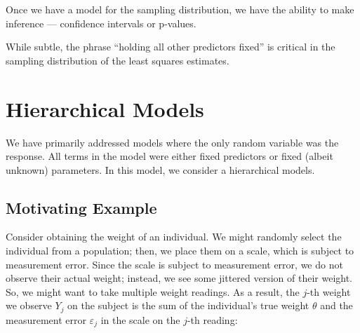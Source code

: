 \documentclass[
  letterpaper,
  DIV=11,
  numbers=noendperiod]{scrreprt}
\theoremstyle{definition}
\theoremstyle{plain}
\theoremstyle{definition}
\theoremstyle{remark}
\begin{document}
Once we have a model for the sampling distribution, we have the ability
to make inference --- confidence intervals or p-values.

\begin{tcolorbox}[enhanced jigsaw, rightrule=.15mm, leftrule=.75mm, opacityback=0, coltitle=black, bottomrule=.15mm, opacitybacktitle=0.6, left=2mm, colframe=quarto-callout-important-color-frame, breakable, colback=white, arc=.35mm, toprule=.15mm, toptitle=1mm, bottomtitle=1mm, title=\textcolor{quarto-callout-important-color}{\faExclamation}\hspace{0.5em}{Important}, titlerule=0mm, colbacktitle=quarto-callout-important-color!10!white]

While subtle, the phrase ``holding all other predictors fixed'' is
critical in the sampling distribution of the least squares estimates.

\end{tcolorbox}


\chapter{Hierarchical Models}\label{sec-hierarchical-models}

\providecommand{\norm}[1]{\left\lVert#1\right\rVert}
\providecommand{\abs}[1]{\left\lvert#1\right\rvert}
\providecommand{\dist}[1]{\stackrel{\text{#1}}{\sim}}
\providecommand{\ind}[1]{\mathbb{I}\left(#1\right)}
\providecommand{\bm}[1]{\mathbf{#1}}
\providecommand{\bs}[1]{\boldsymbol{#1}}
\providecommand{\Ell}{\mathcal{L}}
\providecommand{\indep}{\perp\negthickspace\negmedspace\perp}

We have primarily addressed models where the only random variable was
the response. All terms in the model were either fixed predictors or
fixed (albeit unknown) parameters. In this model, we consider a
hierarchical models.

\section{Motivating Example}\label{motivating-example}

Consider obtaining the weight of an individual. We might randomly select
the individual from a population; then, we place them on a scale, which
is subject to measurement error. Since the scale is subject to
measurement error, we do not observe their actual weight; instead, we
see some jittered version of their weight. So, we might want to take
multiple weight readings. As a result, the \(j\)-th weight we observe
\(Y_j\) on the subject is the sum of the individual's true weight
\(\theta\) and the measurement error \(\varepsilon_j\) in the scale on
the \(j\)-th reading:
\end{document}
